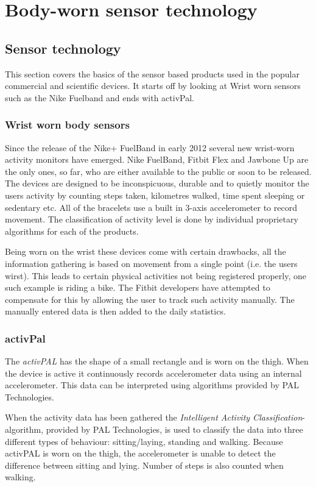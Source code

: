 \chapter{Body-worn sensor technology}

\section{Sensor technology}
This section covers the basics of the sensor based products used in the popular commercial and scientific devices. It starts off by looking at Wrist worn sensors such as the Nike Fuelband and ends with activPal.
\subsection{Wrist worn body sensors}
Since the release of the Nike+ FuelBand \cite{fuelBand} in early 2012 several new wrist-worn activity monitors have emerged. Nike FuelBand, Fitbit Flex and Jawbone Up are the only ones, so far, who are either available to the public or soon to be released. The devices are designed to be inconspicuous, durable and to quietly monitor the users activity by counting steps taken, kilometres walked, time spent sleeping or sedentary etc. All of the bracelets use a built in 3-axis accelerometer to record movement. The classification of activity level is done by individual proprietary algorithms for each of the products. 

Being worn on the wrist these devices come with certain drawbacks, all the information gathering is based on movement from a single point (i.e. the users wirst). This leads to certain physical activities not being registered properly, one such example is riding a bike. The Fitbit developers have attempted to compensate for this by allowing the user to track such activity manually. The manually entered data is then added to the daily statistics. 

\subsection{activPal}
The \emph{activPAL} has the shape of a small rectangle and is worn on the thigh. When the device is active it continuously records accelerometer data using an internal accelerometer. This data can be interpreted using algorithms provided by PAL Technologies.

When the activity data has been gathered the \emph{Intelligent Activity Classification}-algorithm, provided by PAL Technologies, is used to classify the data into three different types of behaviour: sitting/laying, standing and walking. Because activPAL is worn on the thigh, the accelerometer is unable to detect the difference between sitting and lying. Number of steps is also counted when walking.

